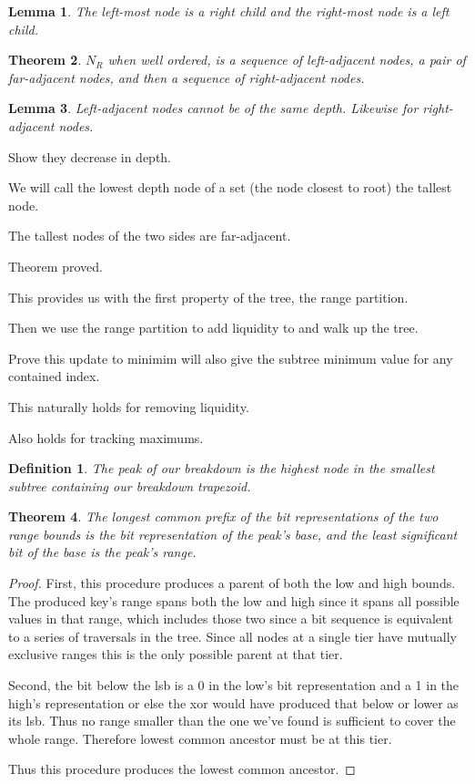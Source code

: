 \documentclass{article}
\newtheorem{definition}{Definition}[section]
\newtheorem{theorem}{Theorem}[section]
\newtheorem{lemma}[theorem]{Lemma}
\begin{document}
\begin{lemma}
  The left-most node is a right child and the right-most node is a left child.
\end{lemma}

\begin{theorem}
  $N_R$ when well ordered, is a sequence of left-adjacent nodes, a pair of
  far-adjacent nodes, and then a sequence of right-adjacent nodes.
\end{theorem}

\begin{lemma}
  Left-adjacent nodes cannot be of the same depth. Likewise for right-adjacent nodes.
\end{lemma}

Show they decrease in depth.

We will call the lowest depth node of a set (the node closest to root) the
tallest node.

The tallest nodes of the two sides are far-adjacent.

Theorem proved.

This provides us with the first property of the tree, the range partition.

Then we use the range partition to add liquidity to and walk up the tree.

Prove this update to minimim will also give the subtree minimum value for any
contained index.

This naturally holds for removing liquidity.

Also holds for tracking maximums.

\begin{definition}
  The peak of our breakdown is the highest node in the smallest subtree
  containing our breakdown trapezoid.
\end{definition}

\begin{theorem}
  The longest common prefix of the bit representations of the two range bounds is the
  bit representation of the peak's base, and the least significant bit of the
  base is the peak's range.
\end{theorem}

\begin{proof}
  First, this procedure produces a parent of both the low and high bounds. The
  produced key's range spans both the low and high since it spans all possible
  values in that range, which includes those two since a bit sequence is
  equivalent to a series of traversals in the tree. Since
  all nodes at a single tier have mutually exclusive ranges this is the only
  possible parent at that tier.

  Second, the bit below the lsb is a 0 in the low's bit representation and a 1
  in the high's representation or else the xor would have produced that below or
  lower as its lsb. Thus no range smaller than the one we've found is sufficient
  to cover the whole range. Therefore lowest common ancestor must be at this
  tier.

  Thus this procedure produces the lowest common ancestor.
\end{proof}
\end{document}
